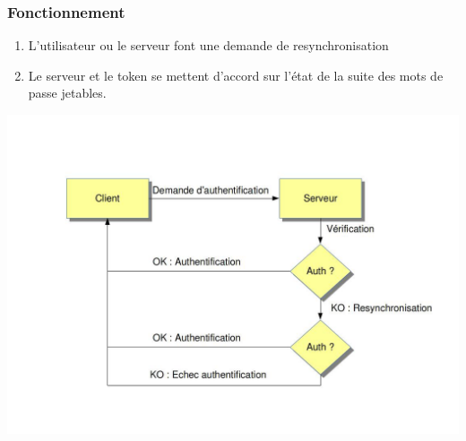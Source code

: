\documentclass{"../../res/univ-projet"}
\begin{document}
\subsubsection{Fonctionnement}
\begin{enumerate}
    \item L'utilisateur ou le serveur font une demande de resynchronisation
    \item Le serveur et le token se mettent d'accord sur l'état de la suite des
    mots de passe jetables.
\end{enumerate}
\includegraphics[width=\textwidth]{../graphics/resynchronisation.jpg}
\end{document}
